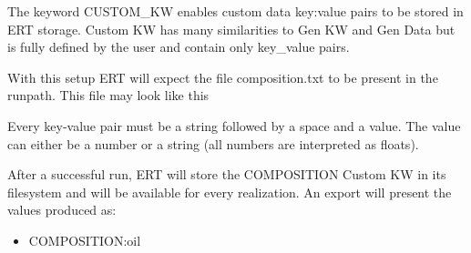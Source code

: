 \documentclass[a4paper,10pt,english]{sphinxmanual}
\begin{document}
\label{\detokenize{keywords/index:custom-kw}}
\begin{sphinxShadowBox}

The keyword CUSTOM\_KW enables custom data key:value pairs
to be stored in ERT storage.  Custom KW has many
similarities to Gen KW and Gen Data but is fully defined by
the user and contain only key\_value pairs.


%
\begin{sphinxVerbatim}[commandchars=\\\{\}]
  

                

            

  
\end{sphinxVerbatim}

With this setup ERT will expect the file composition.txt to be present in the runpath.
This file may look like this

%
\begin{sphinxVerbatim}[commandchars=\\\{\}]
 
 
 
 
 
\end{sphinxVerbatim}

Every key-value pair must be a string followed by a space and a value.
The value can either be a number or a string (all numbers are interpreted as floats).

After a successful run, ERT will store the COMPOSITION
Custom KW in its filesystem and will be available for every
realization.  An export will present the values produced as:
\begin{itemize}
\item {} 
COMPOSITION:oil


\end{itemize}
\end{sphinxShadowBox}
\end{document}
